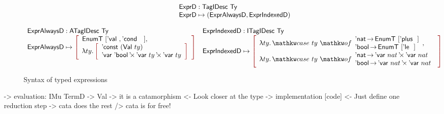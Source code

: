 \begin{figure*}

\[\stkc{
\stk{
\HExprD : \TagIDesc{\Ty} \\
\HExprD \mapsto ( \HExprAD , \HExprID ) \\
} \\
\\
\begin{array}{ll}
\stk{
\HExprAD : \ATagIDesc{\Ty} \\
\HExprAD \mapsto \bigRedBracket{
                 \begin{array}{l}
                   \EnumT{[\Eval{}, \Econd{}{}{}]} \red{,} \\
                   \LAM{ty}
                   \bigRedBracket{
                   \begin{array}{l}
                   \DConst{(\Val{ty})} \\
                   \DProd{\DVar{\Ebool}}{\DProd{\DVar{ty}}{\DVar{ty}}}
                   \end{array}
                   }
                 \end{array}
                 }
\\
\\
} &
\stk{
\HExprID : \ITagIDesc{\Ty} \\
\HExprID \mapsto \bigRedBracket{
                 \begin{array}{l}
                   \LAM{ty} \case{ty}{\Enat \To \EnumT{[\Eplus{}{}]} \\ \Ebool \To \EnumT{[\Ele{}{}]}} \red{,} \\
                   \LAM{ty}
                   \case{ty}{
                     \Enat \To \DProd{\DVar{nat}}{\DVar{nat}} \\
                     \Ebool \To \DProd{\DVar{nat}}{\DVar{nat}}
                   }
                   \end{array}
                   }
}
\end{array}
}\]

\caption{Syntax of typed expressions}
\label{fig:hexpr-full}

\end{figure*}

\begin{wstructure}
    -> evaluation: IMu TermD -> Val
        -> it is a catamorphism
            <- Look closer at the type
        -> implementation [code]
            <- Just define one reduction step
            -> cata does the rest
                /> cata is for free!
\end{wstructure}

